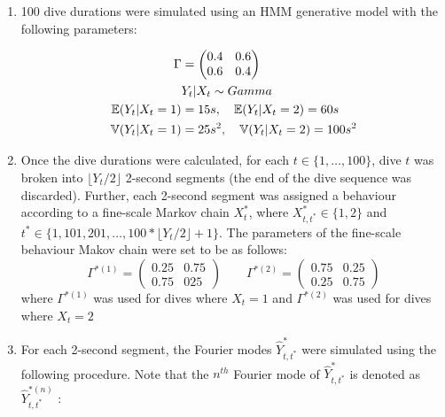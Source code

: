 \begin{enumerate}
	\item 100 dive durations were simulated using an HMM generative model with the following parameters:
	
	\begin{align*}
		\Gamma &= \begin{pmatrix} 0.4 & 0.6 \\ 0.6 & 0.4 \end{pmatrix} \\
		&Y_t|X_t \sim Gamma \\
		\mathbb{E}(Y_t|X_t = 1) &= 15 s, \quad \mathbb{E}(Y_t|X_t = 2) = 60 s \\
		\mathbb{V}(Y_t|X_t = 1) &= 25 s^2, \quad \mathbb{V}(Y_t|X_t = 2) = 100 s^2
	\end{align*}
	
	\item Once the dive durations were calculated, for each $t \in \{1, \ldots, 100\}$, dive $t$ was broken into $\lfloor Y_t/2 \rfloor$ 2-second segments (the end of the dive sequence was discarded). Further, each 2-second segment was assigned a behaviour according to a fine-scale Markov chain $X^*_t$, where $X^*_{t,t^*} \in \{1,2\}$ and $t^* \in \{1,101,201,\ldots,100*\lfloor Y_t/2 \rfloor + 1\}$. The parameters of the fine-scale behaviour Makov chain were set to be as follows:
	$$\Gamma^{*(1)} = \begin{pmatrix} 0.25 & 0.75 \\ 0.75 & 025 \end{pmatrix} \qquad 	\Gamma^{*(2)} = \begin{pmatrix} 0.75 & 0.25 \\ 0.25 & 0.75 \end{pmatrix}$$
	where $\Gamma^{*(1)}$ was used for dives where $X_t = 1$ and $\Gamma^{*(2)}$ was used for dives where $X_t = 2$
	
	\item For each 2-second segment, the Fourier modes $\hat{Y}^*_{t,t^*}$ were simulated using the following procedure. Note that the $n^{th}$ Fourier mode of $\hat{Y}^*_{t,t^*}$ is denoted as $\hat{Y}^{*(n)}_{t,t^*}$ :
	

\end{enumerate}
